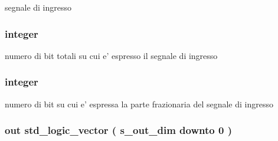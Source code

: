 segnale di ingresso 

\hypertarget{group___truncate_gad3d18243ad6fe53a2277e2aa9b94ca45}{
\subsubsection[{s\+\_\+in\+\_\+dim}]{ {\bfseries \textcolor{vhdlchar}{ }} {\bfseries \textcolor{vhdlchar}{integer}\textcolor{vhdlchar}{ }} \hspace{0.3cm}{\ttfamily [Generic]}}}\label{group___truncate_gad3d18243ad6fe53a2277e2aa9b94ca45}


numero di bit totali su cui e' espresso il segnale di ingresso 

\hypertarget{group___truncate_gabe72b503b8140ab0d84911165e959b53}{
\subsubsection[{s\+\_\+in\+\_\+int}]{ {\bfseries \textcolor{vhdlchar}{ }} {\bfseries \textcolor{vhdlchar}{integer}\textcolor{vhdlchar}{ }} \hspace{0.3cm}{\ttfamily [Generic]}}}\label{group___truncate_gabe72b503b8140ab0d84911165e959b53}


numero di bit su cui e' espressa la parte frazionaria del segnale di ingresso 

\hypertarget{group___truncate_ga7c0b5e84820296cfa624ce710d19debd}{
\subsubsection[{s\+\_\+out}]{ {\bfseries \textcolor{vhdlchar}{out}\textcolor{vhdlchar}{ }} {\bfseries \textcolor{vhdlchar}{std\+\_\+logic\+\_\+vector}\textcolor{vhdlchar}{ }\textcolor{vhdlchar}{(}\textcolor{vhdlchar}{ }\textcolor{vhdlchar}{ }\textcolor{vhdlchar}{ }\textcolor{vhdlchar}{ }{\bfseries {\bf s\+\_\+out\+\_\+dim}} \textcolor{vhdlchar}{ }\textcolor{vhdlchar}{downto}\textcolor{vhdlchar}{ }\textcolor{vhdlchar}{ } \textcolor{vhdldigit}{0} \textcolor{vhdlchar}{ }\textcolor{vhdlchar}{)}\textcolor{vhdlchar}{ }} \hspace{0.3cm}{\ttfamily [Port]}}}\label{group___truncate_ga7c0b5e84820296cfa624ce710d19debd}


